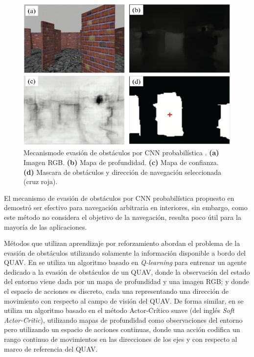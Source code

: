 \begin{figure}[H]
    \centering
    \includegraphics[scale=0.4]{partes/img/P-CNN.png}
    \caption[Mecanismo de evasión de obstáculos por CNN probabilística.]{Mecanismo\footnotemark de evasión de obstáculos por CNN probabilística \cite{Yang2021}. \textbf{(a)} Imagen RGB. \textbf{(b)} Mapa de profundidad. \textbf{(c)} Mapa de confianza. \textbf{(d)} Mascara de obstáculos y dirección de navegación seleccionada (cruz roja).} 
    \label{fig:P-CNN}
\end{figure}

El mecanismo de evasión de obstáculos por CNN probabilística propuesto en \cite{Yang2021} demostró ser efectivo para navegación arbitraria en interiores, sin embargo, como este método no considera el objetivo de la navegación, resulta poco útil para la mayoría de las aplicaciones.

Métodos que utilizan aprendizaje por reforzamiento abordan el problema de la evasión de obstáculos utilizando solamente la información disponible a bordo del QUAV. En \cite{Tu2023} se utiliza un algoritmo basado en \textit{Q-learning} para entrenar un agente dedicado a la evasión de obstáculos de un QUAV, donde la observación del estado del entorno viene dada por un mapa de profundidad y una imagen RGB; y donde el espacio de acciones es discreto, cada una representando una dirección de movimiento con respecto al campo de visión del QUAV. De forma similar, en \cite{Xue2021} se utiliza un algoritmo basado en el método Actor-Crítico suave (del inglés \textit{Soft Actor-Critic}), utilizando mapas de profundidad como observaciones del entorno pero utilizando un espacio de acciones continuas, donde una acción codifica un rango continuo de movimientos en las direcciones de los ejes  y  con respecto al marco de referencia del QUAV. 

